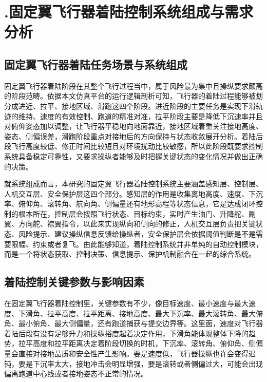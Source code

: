 
\chapter{.固定翼飞行器着陆控制系统组成与需求分析}

\section{固定翼飞行器着陆任务场景与系统组成}

固定翼飞行器着陆阶段在其整个飞行过程当中，属于风险最为集中且操纵要求颇高的阶段范畴。依据本文仿真平台的运行逻辑剖析可知，飞行器的着陆过程能够被划分成进近、拉平、接地区域、滑跑这四个阶段。进近阶段的主要任务是实现下滑轨迹的维持、速度的有效控制、跑道的精准对准，拉平阶段主要是降低下沉速率并且对俯仰姿态加以调整，让飞行器平稳地向地面靠近，接地区域着重关注接地高度、姿态、侧偏误差，滑跑阶段重点对接地后的方向保持与状态收敛展开分析。着陆后段飞行高度较低、修正时间比较短且对环境扰动比较敏感，所以此阶段既要求控制系统具备稳定可靠性，又要求操纵者能够及时把握关键状态的变化情况并做出正确的决策。

就系统组成而言，本研究的固定翼飞行器着陆控制系统主要涵盖感知层、控制层、人机交互层、安全保护层这四个部分。感知层的作用是收集离地高度、速度、下沉率、俯仰角、滚转角、航向角、侧偏量还有地形高程等状态信息，它是达成闭环控制的根本所在，控制层会按照飞行状态、目标约束，实时产生油门、升降舵、副翼、方向舵、襟翼指令，以此来实现纵向和侧向的修正，人机交互层负责把关键状态、风险提示、建议操纵信息反馈给操纵者，安全保护层会依据阈值判断是不是需要限幅、约束或者复飞。由此能够知道，着陆控制系统并非单纯的自动控制模块，而是一个将状态获取、控制决策、信息提示、保护机制融合在一起的综合系统。

\section{着陆控制关键参数与影响因素}

在固定翼飞行器着陆控制里，关键参数有不少，像目标速度、最小速度与最大速度、下滑角、拉平高度、拉平距离、接地高度、最大下沉率、最大滚转角、最大俯角、最小俯角、最大侧偏量，还有跑道捕获与提交边界等。这里面，速度对飞行器着陆后段有没有足够升力和操纵裕度起着决定作用，下滑角能体现整体下降的趋势，拉平高度和拉平距离决定着阶段切换的时机，下沉率、滚转角、俯仰角、侧偏量会直接对接地品质和安全性产生影响。要是速度低，飞行器操纵也许会变得迟钝，要是下沉率太大，接地冲击会明显增强，要是滚转或者侧偏过大，可能会出现偏离跑道中心线或者接地姿态不正常的情况。

